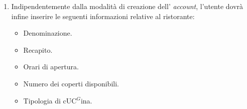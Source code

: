 \begin{itemize}
\begin{enumerate}
            \item Indipendentemente dalla modalità di creazione dell' \textit{account}, l'utente dovrà infine inserire le seguenti informazioni relative al ristorante:
                \begin{itemize}
                    \item Denominazione.
                    \item Recapito.
                    \item Orari di apertura.
                    \item Numero dei coperti disponibili.
                    \item Tipologia di c\gls{UC}$^G$ina.
                \end{itemize}
	\end{enumerate}
	
\end{itemize}